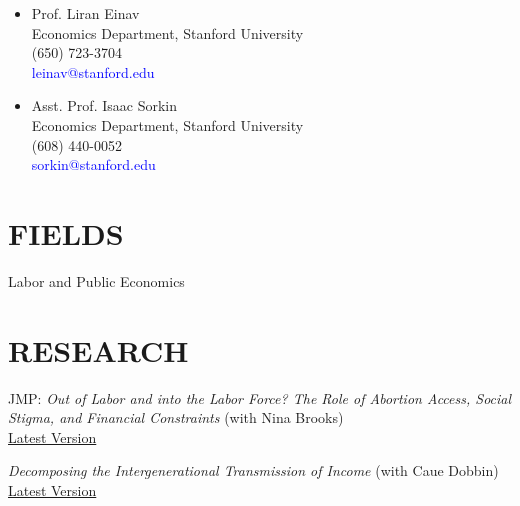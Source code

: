\documentclass[margin]{res} %
\newcommand{\rootFolder}{/Users/tomzohar/Dropbox/}
\begin{document}
\begin{resume}
\begin{multicols}{2}
\begin{itemize}
		 \item[] Prof. Liran Einav\\
		Economics Department, Stanford University \\
		(650) 723-3704 \\
		\textcolor{blue}{leinav@stanford.edu} \\

		 \item[] Asst. Prof. Isaac Sorkin\\
		Economics Department, Stanford University \\
		(608) 440-0052 \\
		\textcolor{blue}{sorkin@stanford.edu} \\

	\end{itemize}
\end{multicols}
 
 
\section{FIELDS}  
 Labor and Public Economics%
 

\section{ RESEARCH} 

JMP: \textit{Out of Labor and into the Labor Force? The Role of Abortion Access, Social Stigma, and Financial Constraints} (with Nina Brooks) \\
\href{https://web.stanford.edu/~tzohar/Tom%20Zohar%20-%20JMP.pdf}{Latest Version}




\textit{Decomposing the Intergenerational Transmission of Income} (with Caue Dobbin) \\
\href{https://www.dropbox.com/s/xodwuv0ui28xt8t/IGM_decomposition.pdf?dl=0}{Latest Version}


\end{resume}
\end{document}
